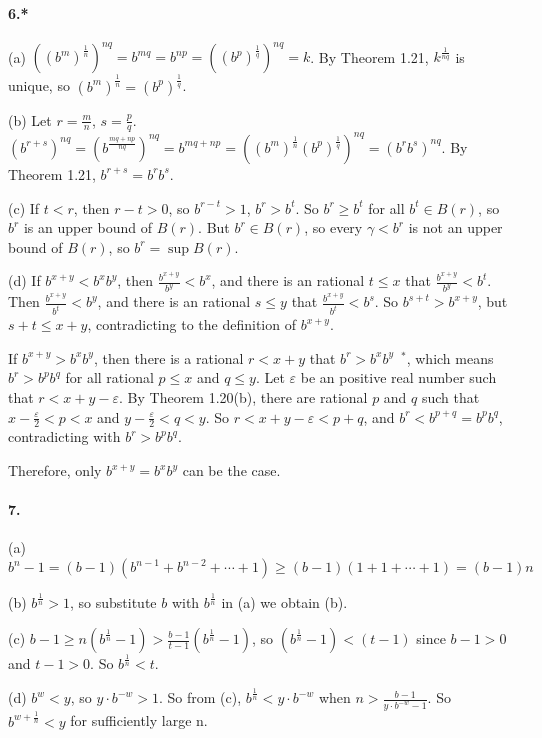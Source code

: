 \documentclass[a4paper]{article}
\begin{document}
\paragraph{6.*}
(a) $((b^m)^{\frac{1}{n}})^{nq}=b^{mq}=b^{np}=((b^p)^{\frac{1}{q}})^{nq}=k$. By Theorem 1.21, $k^{\frac{1}{nq}}$ is unique, so $(b^m)^{\frac{1}{n}}=(b^p)^{\frac{1}{q}}$. 
\medskip

(b) Let $r=\frac{m}{n}$, $s=\frac{p}{q}$. $(b^{r+s})^{nq}=(b^{\frac{mq+np}{nq}})^{nq}=b^{mq+np}=((b^m)^{\frac{1}{n}}(b^p)^{\frac{1}{q}})^{nq}=(b^rb^s)^{nq}$. By \\Theorem 1.21, $b^{r+s}=b^rb^s$.
\medskip

(c) If $t<r$, then $r-t>0$, so $b^{r-t}>1$, $b^r>b^t$. So $b^r\geq b^t$ for all $b^t\in B(r)$, so $b^r$ is an upper bound of $B(r)$. But $b^r\in B(r)$, so every $\gamma<b^r$ is not an upper bound of $B(r)$, so $b^r=\sup B(r)$.
\medskip

(d) If $b^{x+y}<b^xb^y$, then $\frac{b^{x+y}}{b^y}<b^x$, and there is an rational $t\leq x$ that $\frac{b^{x+y}}{b^y}<b^t$. Then $\frac{b^{x+y}}{b^t}<b^y$, and there is an rational $s\leq y$ that $\frac{b^{x+y}}{b^t}<b^s$. So $b^{s+t}>b^{x+y}$, but $s+t\leq x+y$, contradicting to the definition of $b^{x+y}$.

If $b^{x+y}>b^xb^y$, then there is a rational $r<x+y$ that $b^r>b^xb^y$ $\,^*$, which means $b^r>b^pb^q$ for all rational $p\leq x$ and $q\leq y$. Let $\varepsilon$ be an positive real number such that $r<x+y-\varepsilon$. By Theorem 1.20(b), there are rational $p$ and $q$ such that $x-\frac{\varepsilon}{2}<p<x$ and $y-\frac{\varepsilon}{2}<q<y$. So $r<x+y-\varepsilon<p+q$, and $b^r<b^{p+q}=b^pb^q$, contradicting with $b^r>b^pb^q$.

Therefore, only $b^{x+y}=b^xb^y$ can be the case.

\paragraph{7.}
(a) 
$b^n-1=(b-1)(b^{n-1}+b^{n-2}+\cdots +1)\geq (b-1)(1+1+\cdots +1)=(b-1)n$
\medskip

(b)
$b^{\frac{1}{n}}>1$, so substitute $b$ with $b^{\frac{1}{n}}$ in (a) we obtain (b).
\medskip

(c)
$b-1\geq n(b^{\frac{1}{n}}-1)>\frac{b-1}{t-1}(b^{\frac{1}{n}}-1)$, so $(b^{\frac{1}{n}}-1)<(t-1)$ since $b-1>0$ and $t-1>0$. So $b^{\frac{1}{n}}<t$.
\medskip

(d)
$b^w<y$, so $y\cdot b^{-w}>1$. So from (c), $b^{\frac{1}{n}}<y\cdot b^{-w}$ when $n>\frac{b-1}{y\cdot b^{-w}-1}$. So $b^{w+\frac{1}{n}}<y$ for sufficiently large n.
\medskip
\end{document}
